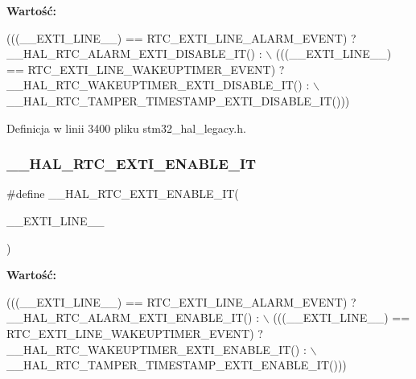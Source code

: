 {\bfseries Wartość\+:}
\begin{DoxyCode}
(((\_\_EXTI\_LINE\_\_) == RTC\_EXTI\_LINE\_ALARM\_EVENT) ? \_\_HAL\_RTC\_ALARM\_EXTI\_DISABLE\_IT() : \(\backslash\)
                                                  (((\_\_EXTI\_LINE\_\_) == RTC\_EXTI\_LINE\_WAKEUPTIMER\_EVENT) ? 
      \_\_HAL\_RTC\_WAKEUPTIMER\_EXTI\_DISABLE\_IT() : \(\backslash\)
                                                      \_\_HAL\_RTC\_TAMPER\_TIMESTAMP\_EXTI\_DISABLE\_IT()))
\end{DoxyCode}


Definicja w linii 3400 pliku stm32\+\_\+hal\+\_\+legacy.\+h.

\mbox{\label{group___h_a_l___r_t_c___aliased___macros_ga16764e0df245c740813dbeb302e67da5}} 
\subsubsection{\texorpdfstring{\+\_\+\+\_\+\+H\+A\+L\+\_\+\+R\+T\+C\+\_\+\+E\+X\+T\+I\+\_\+\+E\+N\+A\+B\+L\+E\+\_\+\+IT}{\_\_HAL\_RTC\_EXTI\_ENABLE\_IT}}
{\footnotesize\ttfamily \#define \+\_\+\+\_\+\+H\+A\+L\+\_\+\+R\+T\+C\+\_\+\+E\+X\+T\+I\+\_\+\+E\+N\+A\+B\+L\+E\+\_\+\+IT(\begin{DoxyParamCaption}\item[{}]{\+\_\+\+\_\+\+E\+X\+T\+I\+\_\+\+L\+I\+N\+E\+\_\+\+\_\+ }\end{DoxyParamCaption})}

{\bfseries Wartość\+:}
\begin{DoxyCode}
(((\_\_EXTI\_LINE\_\_)  == RTC\_EXTI\_LINE\_ALARM\_EVENT) ? \_\_HAL\_RTC\_ALARM\_EXTI\_ENABLE\_IT() : \(\backslash\)
                                                  (((\_\_EXTI\_LINE\_\_) == RTC\_EXTI\_LINE\_WAKEUPTIMER\_EVENT) ? 
      \_\_HAL\_RTC\_WAKEUPTIMER\_EXTI\_ENABLE\_IT() : \(\backslash\)
                                                      \_\_HAL\_RTC\_TAMPER\_TIMESTAMP\_EXTI\_ENABLE\_IT()))
\end{DoxyCode}


